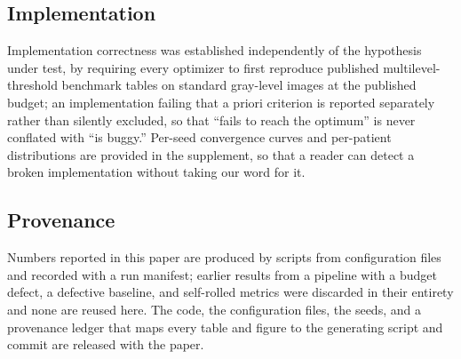 \subsection{Implementation}

Implementation correctness was established independently of the hypothesis under
test, by requiring every optimizer to first reproduce published multilevel-%
threshold benchmark tables on standard gray-level images at the published budget;
an implementation failing that a priori criterion is reported separately rather
than silently excluded, so that ``fails to reach the optimum'' is never conflated
with ``is buggy.'' Per-seed convergence curves and per-patient distributions are
provided in the supplement, so that a reader can detect a broken implementation
without taking our word for it.

\subsection{Provenance}

Numbers reported in this paper are produced by scripts from configuration files
and recorded with a run manifest; earlier results from a pipeline with a budget
defect, a defective baseline, and self-rolled metrics were discarded in their
entirety and none are reused here. The code, the configuration files, the seeds,
and a provenance ledger that maps every table and figure to the generating script
and commit are released with the paper.
